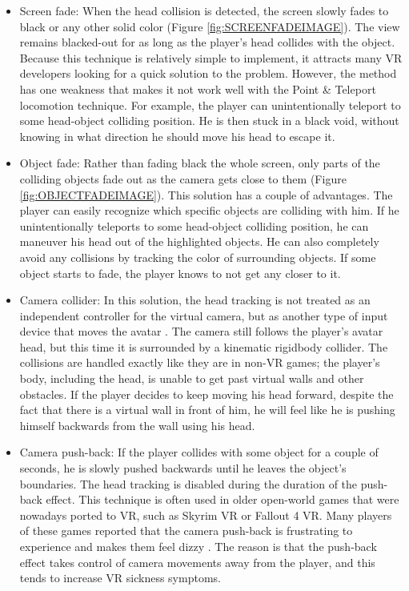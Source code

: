 \begin{itemize}
\item Screen fade: When the head collision is detected, the screen slowly fades to black or any other solid color (Figure \ref{fig:SCREENFADEIMAGE}). The view remains blacked-out for as long as the player's head collides with the object. Because this technique is relatively simple to implement, it attracts many VR developers looking for a quick solution to the problem. However, the method has one weakness that makes it not work well with the Point \& Teleport locomotion technique. For example, the player can unintentionally teleport to some head-object colliding position. He is then stuck in a black void, without knowing in what direction he should move his head to escape it.

\item Object fade: Rather than fading black the whole screen, only parts of the colliding objects fade out as the camera gets close to them (Figure \ref{fig:OBJECTFADEIMAGE}). This solution has a couple of advantages. The player can easily recognize which specific objects are colliding with him. If he unintentionally teleports to some head-object colliding position, he can maneuver his head out of the highlighted objects. He can also completely avoid any collisions by tracking the color of surrounding objects. If some object starts to fade, the player knows to not get any closer to it.

\item Camera collider: In this solution, the head tracking is not treated as an independent controller for the virtual camera, but as another type of input device that moves the avatar \cite{CAMERACOLLIDER}. The camera still follows the player's avatar head, but this time it is surrounded by a kinematic rigidbody collider. The collisions are handled exactly like they are in non-VR games; the player's body, including the head, is unable to get past virtual walls and other obstacles. If the player decides to keep moving his head forward, despite the fact that there is a virtual wall in front of him, he will feel like he is pushing himself backwards from the wall using his head.

\item Camera push-back: If the player collides with some object for a couple of seconds, he is slowly pushed backwards until he leaves the object's boundaries. The head tracking is disabled during the duration of the push-back effect. This technique is often used in older open-world games that were nowadays ported to VR, such as Skyrim VR or Fallout 4 VR. Many players of these games reported that the camera push-back is frustrating to experience and makes them feel dizzy \cite{redditfallout}\cite{SKYRIMVRPUSHBACK}\cite{PUSHBACKFEEDBACK}. The reason is that the push-back effect takes control of camera movements away from the player, and this tends to increase VR sickness symptoms.
\end{itemize}

